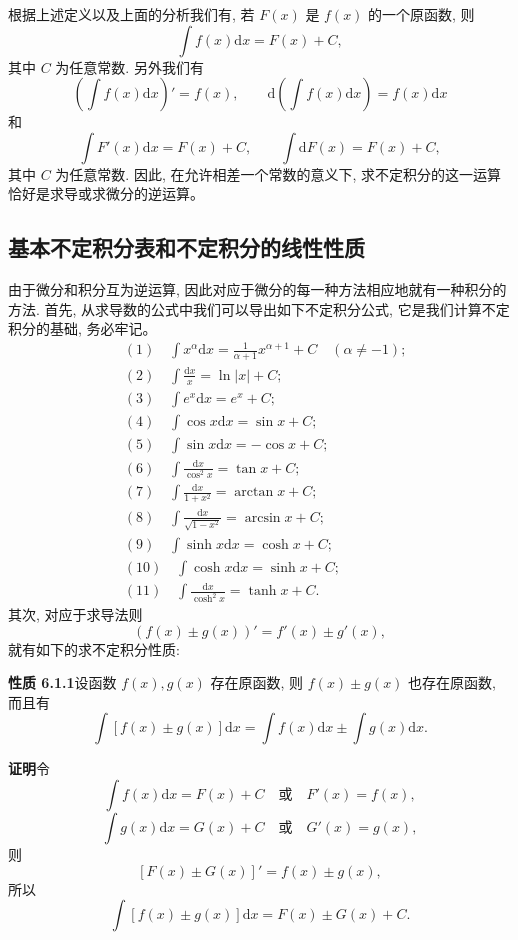\documentclass[UTF8, 12pt, fontset=fandol, oneside]{ctexart}
\begin{document}
根据上述定义以及上面的分析我们有, 若 $F(x)$ 是 $f(x)$ 的一个原函数, 则
\[
  \int f(x)\mathrm dx=F(x)+C,
\]
其中 $C$ 为任意常数. 另外我们有
\[
  \left(\int f(x)\mathrm dx\right)'=f(x),
  \qquad
  \mathrm d\left(\int f(x)\mathrm dx\right)=f(x)\mathrm dx
\]
和
\[
  \int F'(x)\mathrm dx=F(x)+C,
  \qquad
  \int \mathrm dF(x)=F(x)+C,
\]
其中 $C$ 为任意常数. 因此, 在允许相差一个常数的意义下, 求不定积分的这一运算恰好是求导或求微分的逆运算。

\subsection{基本不定积分表和不定积分的线性性质}

由于微分和积分互为逆运算, 因此对应于微分的每一种方法相应地就有一种积分的方法. 首先, 从求导数的公式中我们可以导出如下不定积分公式, 它是我们计算不定积分的基础, 务必牢记。
\[
\begin{aligned}
  &(1)\quad \int x^\alpha\mathrm dx=\frac1{\alpha+1}x^{\alpha+1}+C
  \quad(\alpha\ne-1);\\
  &(2)\quad \int\frac{\mathrm dx}{x}=\ln|x|+C;\\
  &(3)\quad \int e^x\mathrm dx=e^x+C;\\
  &(4)\quad \int\cos x\mathrm dx=\sin x+C;\\
  &(5)\quad \int\sin x\mathrm dx=-\cos x+C;\\
  &(6)\quad \int\frac{\mathrm dx}{\cos^2x}=\tan x+C;\\
  &(7)\quad \int\frac{\mathrm dx}{1+x^2}=\arctan x+C;\\
  &(8)\quad \int\frac{\mathrm dx}{\sqrt{1-x^2}}=\arcsin x+C;\\
  &(9)\quad \int\sinh x\mathrm dx=\cosh x+C;\\
  &(10)\quad \int\cosh x\mathrm dx=\sinh x+C;\\
  &(11)\quad \int\frac{\mathrm dx}{\cosh^2x}=\tanh x+C.
\end{aligned}
\]
其次, 对应于求导法则
\[
  (f(x)\pm g(x))'=f'(x)\pm g'(x),
\]
就有如下的求不定积分性质:

\noindent\textbf{性质 6.1.1}\quad 设函数 $f(x),g(x)$ 存在原函数, 则 $f(x)\pm g(x)$ 也存在原函数, 而且有
\[
  \int[f(x)\pm g(x)]\mathrm dx
  =
  \int f(x)\mathrm dx\pm\int g(x)\mathrm dx.
\]

\noindent\textbf{证明}\quad 令
\[
  \int f(x)\mathrm dx=F(x)+C
  \quad\text{或}\quad
  F'(x)=f(x),
\]
\[
  \int g(x)\mathrm dx=G(x)+C
  \quad\text{或}\quad
  G'(x)=g(x),
\]
则
\[
  [F(x)\pm G(x)]'=f(x)\pm g(x),
\]
所以
\[
  \int[f(x)\pm g(x)]\mathrm dx=F(x)\pm G(x)+C.
\]
\end{document}
